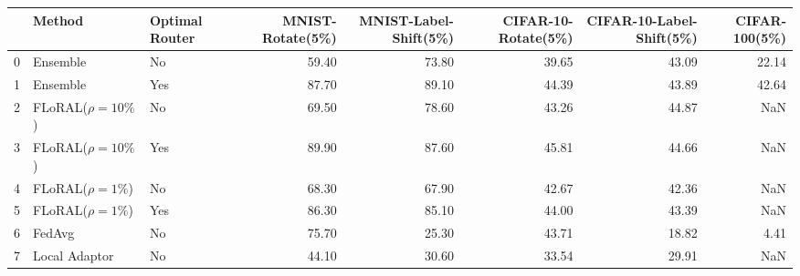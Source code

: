 \begin{tabular}{lllrrrrr}
\toprule
 & Method & Optimal Router & MNIST-Rotate(5\%) & MNIST-Label-Shift(5\%) & CIFAR-10-Rotate(5\%) & CIFAR-10-Label-Shift(5\%) & CIFAR-100(5\%) \\
\midrule
0 & Ensemble & No & 59.40 & 73.80 & 39.65 & 43.09 & 22.14 \\
1 & Ensemble & Yes & 87.70 & 89.10 & 44.39 & 43.89 & 42.64 \\
2 & FLoRAL($\rho=10\%$) & No & 69.50 & 78.60 & 43.26 & 44.87 & NaN \\
3 & FLoRAL($\rho=10\%$) & Yes & 89.90 & 87.60 & 45.81 & 44.66 & NaN \\
4 & FLoRAL($\rho=1\%$) & No & 68.30 & 67.90 & 42.67 & 42.36 & NaN \\
5 & FLoRAL($\rho=1\%$) & Yes & 86.30 & 85.10 & 44.00 & 43.39 & NaN \\
6 & FedAvg & No & 75.70 & 25.30 & 43.71 & 18.82 & 4.41 \\
7 & Local Adaptor & No & 44.10 & 30.60 & 33.54 & 29.91 & NaN \\
\bottomrule
\end{tabular}
